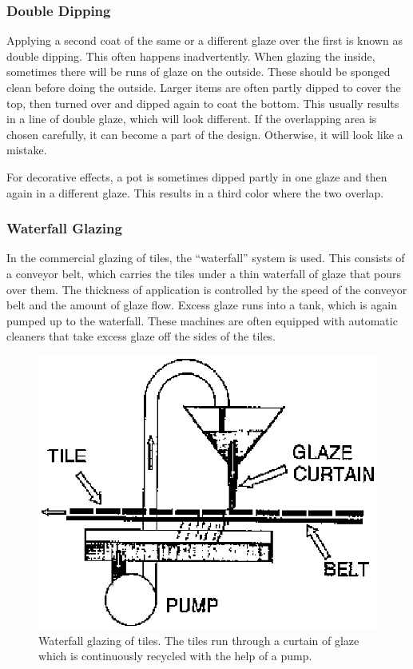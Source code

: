 \subsubsection{Double Dipping}
Applying a second coat of the same or a different glaze over the first is known 
as double dipping. This often happens inadvertently. When glazing the inside, 
sometimes there will be runs of glaze on the outside. These should be sponged 
clean before doing the outside. Larger items are often partly dipped to cover 
the top, then turned over and dipped again to coat the bottom. This usually 
results in a line of double glaze, which will look different. If the 
overlapping area is chosen carefully, it can become a part of the design. 
Otherwise, it will look like a mistake.

For decorative effects, a pot is sometimes dipped partly in one glaze and then 
again in a different glaze. This results in a third color where the two overlap.
\subsubsection{Waterfall Glazing}
In the commercial glazing of tiles, the ``waterfall'' system is used. This 
consists of a conveyor belt, which carries the tiles under a thin waterfall of 
glaze that pours over them. The thickness of application is controlled by the 
speed of the conveyor belt and the amount of glaze flow. Excess glaze runs into 
a tank, which is again pumped up to the waterfall. These machines are often 
equipped with automatic cleaners that take excess glaze off the sides of the 
tiles.
\begin{figure}[htbp!]
  \centering
  \includegraphics[width=0.7\linewidth]{img/glazingwaterfall.eps}
  \caption{Waterfall glazing of tiles. The tiles run through a curtain of glaze 
  which is continuously recycled with the help of a pump.}
  \label{fig:glazingwaterfall}
\end{figure}
